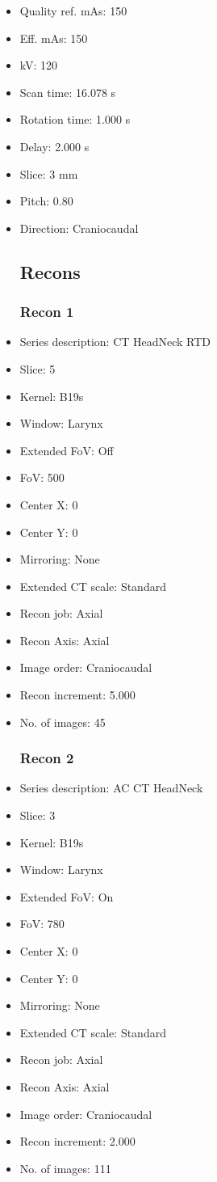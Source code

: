 \documentclass[12pt]{article}
\begin{document}
\begin{itemize}
\subsection{Scan}
\item Quality ref. mAs: 150\item Eff. mAs: 150\item kV: 120\item Scan time: 16.078 s\item Rotation time: 1.000 s\item Delay: 2.000 s\item Slice: 3 mm\item Pitch: 0.80\item Direction: Craniocaudal\subsection{Recons}

\subsubsection{Recon 1}
\item Series description: CT HeadNeck RTD
\item Slice: 5
\item Kernel: B19s
\item Window: Larynx
\item Extended FoV: Off
\item FoV: 500
\item Center X: 0
\item Center Y: 0
\item Mirroring: None
\item Extended CT scale: Standard
\item Recon job: Axial
\item Recon Axis: Axial
\item Image order: Craniocaudal
\item Recon increment: 5.000
\item No. of images: 45
\subsubsection{Recon 2}
\item Series description: AC CT HeadNeck
\item Slice: 3
\item Kernel: B19s
\item Window: Larynx
\item Extended FoV: On
\item FoV: 780
\item Center X: 0
\item Center Y: 0
\item Mirroring: None
\item Extended CT scale: Standard
\item Recon job: Axial
\item Recon Axis: Axial
\item Image order: Craniocaudal
\item Recon increment: 2.000
\item No. of images: 111

\end{itemize}
\end{document}
